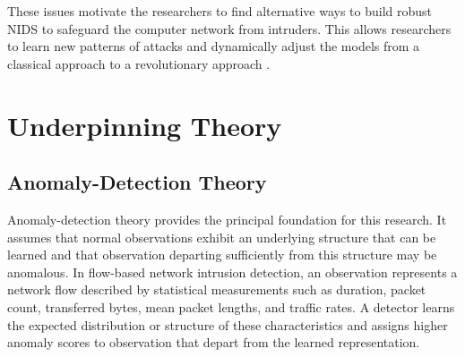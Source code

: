 These issues motivate the researchers to find alternative ways to build robust NIDS to safeguard the computer network from intruders. This allows researchers 
to learn new patterns of attacks and dynamically adjust the models from a classical approach to a revolutionary approach \cite{Kottilingal2024}.

\section{Underpinning Theory}
\label{sec:underpinning-theory}

\subsection{Anomaly-Detection Theory}
\label{subsec:anomaly-detection-theory}

Anomaly-detection theory provides the principal foundation for this research. It assumes that normal observations exhibit an underlying structure that can be learned and that observation departing sufficiently 
from this structure may be anomalous. In flow-based network intrusion detection, an observation represents a network flow described by statistical measurements such as duration, packet count, transferred bytes, 
mean packet lengths, and traffic rates. A detector learns the expected distribution or structure of these characteristics and assigns higher anomaly scores to observation that depart from the learned representation.

